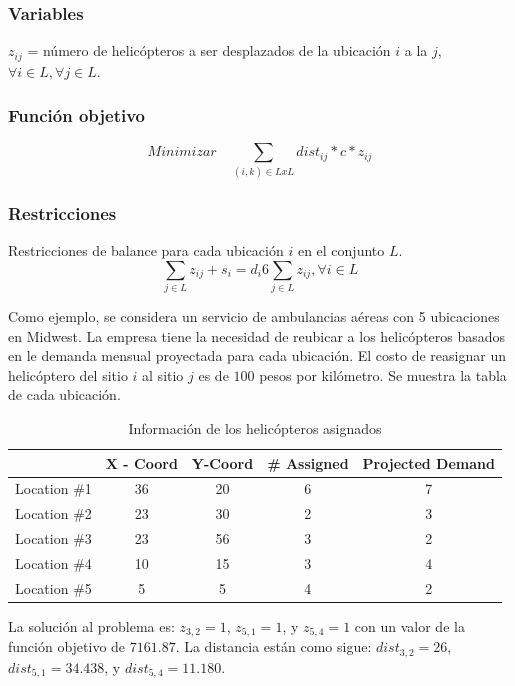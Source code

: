 \subsubsection*{Variables}
$z_{ij}$ = número de helicópteros a ser desplazados de la ubicación $i$ a la $j$, $\forall i \in L, \forall j \in L$.

\subsubsection*{Función objetivo}
\begin{equation}
Minimizar \quad \sum_{(i,k) \in LxL} dist_{ij} * c * z_{ij}
\end{equation}
\subsubsection*{Restricciones}
Restricciones de balance para cada ubicación $i$ en el conjunto $L$.
\begin{equation}
\sum_{j \in L} z_{ij} + s_i = d_i 6 \sum_{j \in L} z_{ij}, \forall i \in L
\end{equation}

Como ejemplo, se considera un servicio de ambulancias aéreas con 5 ubicaciones en Midwest.
%
La empresa tiene la necesidad de reubicar a los helicópteros basados en le demanda mensual proyectada para cada ubicación.
%
El costo de reasignar un helicóptero del sitio $i$ al sitio $j$ es de $100$ pesos por kilómetro.
%
Se muestra la tabla de cada ubicación.
\begin{table}[]
\centering
\caption{Información de los helicópteros asignados}
\label{my-label}
\begin{tabular}{c|c|c|c|c}
\hline
\textbf{} & \textbf{X - Coord} & \textbf{Y-Coord} & \textbf{\# Assigned} & \textbf{Projected Demand} \\ \hline
Location \#1 & 36 & 20 & 6 & 7 \\ \hline
Location \#2 & 23 & 30 & 2 & 3 \\ \hline
Location \#3 & 23 & 56 & 3 & 2 \\ \hline
Location \#4 & 10 & 15 & 3 & 4 \\ \hline
Location \#5 & 5 & 5 & 4 & 2 \\ \hline
\end{tabular}
\end{table}

La solución al problema es: $z_{3,2}=1$, $z_{5,1}=1$, y $z_{5,4}=1$ con un valor de la función objetivo de $7161.87$.
%
La distancia están como sigue: $dist_{3,2}=26$, $dist_{5,1}=34.438$, y $dist_{5,4}=11.180$.


